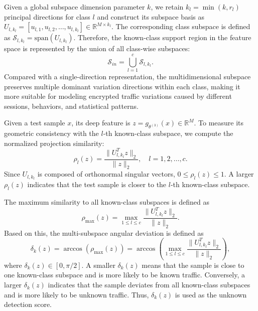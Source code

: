 \documentclass{SCIS2026}
\begin{document}
Given a global subspace dimension parameter $k$, we retain $k_l=\min(k,r_l)$ principal directions for class $l$ and construct its subspace basis as $U_{l,k_l}=[u_{l,1},u_{l,2},\ldots,u_{l,k_l}]\in\mathbb{R}^{M\times k_l}$. The corresponding class subspace is defined as $\mathcal{S}_{l,k_l}=\mathrm{span}(U_{l,k_l})$. Therefore, the known-class support region in the feature space is represented by the union of all class-wise subspaces:
\begin{equation}
	\mathcal{S}_{in}
	=
	\bigcup_{l=1}^{c}\mathcal{S}_{l,k_l}.
\end{equation}
Compared with a single-direction representation, the multidimensional subspace preserves multiple dominant variation directions within each class, making it more suitable for modeling encrypted traffic variations caused by different sessions, behaviors, and statistical patterns.

Given a test sample $x$, its deep feature is $z=g_{\theta^{(3)}}(x)\in\mathbb{R}^{M}$. To measure its geometric consistency with the $l$-th known-class subspace, we compute the normalized projection similarity:
\begin{equation}
	\rho_l(z)
	=
	\frac{\|U_{l,k_l}^{T}z\|_2}{\|z\|_2},
	\quad
	l=1,2,\ldots,c.
	\label{eq:subspace_similarity}
\end{equation}
Since $U_{l,k_l}$ is composed of orthonormal singular vectors, $0\leq\rho_l(z)\leq1$. A larger $\rho_l(z)$ indicates that the test sample is closer to the $l$-th known-class subspace.

The maximum similarity to all known-class subspaces is defined as
\begin{equation}
	\rho_{\max}(z)
	=
	\max_{1\leq l\leq c}
	\frac{\|U_{l,k_l}^{T}z\|_2}{\|z\|_2}.
	\label{eq:max_similarity}
\end{equation}
Based on this, the multi-subspace angular deviation is defined as
\begin{equation}
	\delta_k(z)
	=
	\arccos(\rho_{\max}(z))
	=
	\arccos
	\left(
	\max_{1\leq l\leq c}
	\frac{\|U_{l,k_l}^{T}z\|_2}{\|z\|_2}
	\right),
	\label{eq:angular_deviation}
\end{equation}
where $\delta_k(z)\in[0,\pi/2]$. A smaller $\delta_k(z)$ means that the sample is close to one known-class subspace and is more likely to be known traffic. Conversely, a larger $\delta_k(z)$ indicates that the sample deviates from all known-class subspaces and is more likely to be unknown traffic. Thus, $\delta_k(z)$ is used as the unknown detection score.
\end{document}
